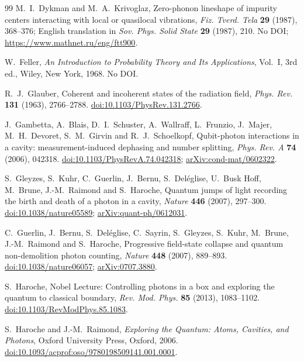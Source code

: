\documentclass[11pt,reqno]{amsart}
\numberwithin{equation}{section}
\theoremstyle{plain}
\theoremstyle{definition}
\theoremstyle{remark}
\begin{document}
\begin{thebibliography}{99}
M.~I.~Dykman and M.~A.~Krivoglaz, Zero-phonon lineshape of impurity centers interacting with local or quasilocal vibrations, \emph{Fiz. Tverd. Tela} \textbf{29} (1987), 368--376; English translation in \emph{Sov. Phys. Solid State} \textbf{29} (1987), 210. No DOI;
\href{https://www.mathnet.ru/eng/ftt900}{https://www.mathnet.ru/eng/ftt900}.

W.~Feller, \emph{An Introduction to Probability Theory and Its Applications}, Vol.~I, 3rd ed., Wiley, New York, 1968. No DOI.

R.~J.~Glauber, Coherent and incoherent states of the radiation field, \emph{Phys. Rev.} \textbf{131} (1963), 2766--2788.
\href{https://doi.org/10.1103/PhysRev.131.2766}{doi:10.1103/PhysRev.131.2766}.

J.~Gambetta, A.~Blais, D.~I.~Schuster, A.~Wallraff, L.~Frunzio, J.~Majer, M.~H.~Devoret, S.~M.~Girvin and R.~J.~Schoelkopf, Qubit-photon interactions in a cavity: measurement-induced dephasing and number splitting, \emph{Phys. Rev. A} \textbf{74} (2006), 042318.
\href{https://doi.org/10.1103/PhysRevA.74.042318}{doi:10.1103/PhysRevA.74.042318};
\href{https://arxiv.org/abs/cond-mat/0602322}{arXiv:cond-mat/0602322}.

S.~Gleyzes, S.~Kuhr, C.~Guerlin, J.~Bernu, S.~Del\'eglise, U.~Busk Hoff, M.~Brune, J.-M.~Raimond and S.~Haroche, Quantum jumps of light recording the birth and death of a photon in a cavity, \emph{Nature} \textbf{446} (2007), 297--300.
\href{https://doi.org/10.1038/nature05589}{doi:10.1038/nature05589};
\href{https://arxiv.org/abs/quant-ph/0612031}{arXiv:quant-ph/0612031}.

C.~Guerlin, J.~Bernu, S.~Del\'eglise, C.~Sayrin, S.~Gleyzes, S.~Kuhr, M.~Brune, J.-M.~Raimond and S.~Haroche, Progressive field-state collapse and quantum non-demolition photon counting, \emph{Nature} \textbf{448} (2007), 889--893.
\href{https://doi.org/10.1038/nature06057}{doi:10.1038/nature06057};
\href{https://arxiv.org/abs/0707.3880}{arXiv:0707.3880}.

S.~Haroche, Nobel Lecture: Controlling photons in a box and exploring the quantum to classical boundary, \emph{Rev. Mod. Phys.} \textbf{85} (2013), 1083--1102.
\href{https://doi.org/10.1103/RevModPhys.85.1083}{doi:10.1103/RevModPhys.85.1083}.

S.~Haroche and J.-M.~Raimond, \emph{Exploring the Quantum: Atoms, Cavities, and Photons}, Oxford University Press, Oxford, 2006.
\href{https://doi.org/10.1093/acprof:oso/9780198509141.001.0001}{doi:10.1093/acprof:oso/9780198509141.001.0001}.


\end{thebibliography}
\end{document}
